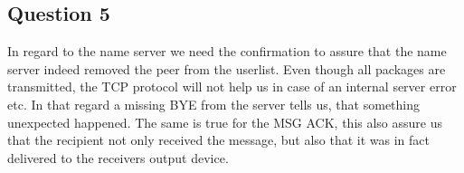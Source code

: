 \subsection{Question 5}
In regard to the name server we need the confirmation to assure that the name
server indeed removed the peer from the userlist. Even though all packages are
transmitted, the TCP protocol will not help us in case of an internal server
error etc. In that regard a missing BYE from the server tells us, that
something unexpected happened.
The same is true for the MSG ACK, this also assure us that the recipient not
only received the message, but also that it was in fact delivered to the
receivers output device.
